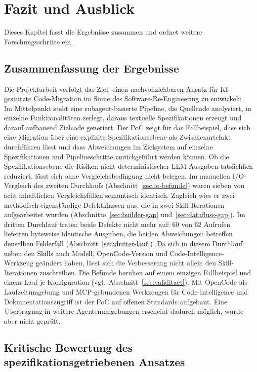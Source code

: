 \section{Fazit und Ausblick} \label{fazit}

Dieses Kapitel fasst die Ergebnisse zusammen und ordnet weitere Forschungsschritte ein.

\subsection{Zusammenfassung der Ergebnisse}

Die Projektarbeit verfolgt das Ziel, einen nachvollziehbaren Ansatz für KI-gestützte Code-Migration im Sinne des Software-Re-Engineering zu entwickeln. Im Mittelpunkt steht eine subagent-basierte Pipeline, die Quellcode analysiert, in einzelne Funktionalitäten zerlegt, daraus textuelle Spezifikationen erzeugt und darauf aufbauend Zielcode generiert. Der PoC zeigt für das Fallbeispiel, dass sich eine Migration über eine explizite Spezifikationsebene als Zwischenartefakt durchführen lässt und dass Abweichungen im Zielsystem auf einzelne Spezifikationen und Pipelineschritte zurückgeführt werden können. Ob die Spezifikationsebene die Risiken nicht-deterministischer LLM-Ausgaben tatsächlich reduziert, lässt sich ohne Vergleichsbedingung nicht belegen. Im manuellen I/O-Vergleich des zweiten Durchlaufs (Abschnitt~\ref{sec:io-befunde}) waren sieben von acht inhaltlichen Vergleichsfällen semantisch identisch. Zugleich wies er zwei methodisch eigenständige Defektklassen aus, die in zwei Skill-Iterationen aufgearbeitet wurden (Abschnitte~\ref{sec:builder-gap} und~\ref{sec:datafluss-gap}). Im dritten Durchlauf traten beide Defekte nicht mehr auf: 60 von 62 Aufrufen lieferten byteweise identische Ausgaben, die beiden Abweichungen betreffen denselben Fehlerfall (Abschnitt~\ref{sec:dritter-lauf}). Da sich in diesem Durchlauf neben den Skills auch Modell, OpenCode-Version und Code-Intelligence-Werkzeug geändert haben, lässt sich die Verbesserung nicht allein den Skill-Iterationen zuschreiben. Die Befunde beruhen auf einem einzigen Fallbeispiel und einem Lauf je Konfiguration (vgl.\ Abschnitt~\ref{sec:validitaet}). Mit OpenCode als Laufzeitumgebung und MCP-gebundenen Werkzeugen für Code-Intelligence und Dokumentationszugriff ist der PoC auf offenen Standards aufgebaut. Eine Übertragung in weitere Agentenumgebungen erscheint dadurch möglich, wurde aber nicht geprüft.

\subsection{Kritische Bewertung des spezifikationsgetriebenen Ansatzes}

